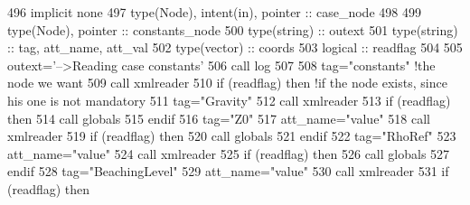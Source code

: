 \begin{DoxyCode}
496     \textcolor{keywordtype}{implicit none}
497     \textcolor{keywordtype}{type}(Node), \textcolor{keywordtype}{intent(in)}, \textcolor{keywordtype}{pointer} :: case\_node
498 
499     \textcolor{keywordtype}{type}(Node), \textcolor{keywordtype}{pointer} :: constants\_node
500     \textcolor{keywordtype}{type}(string) :: outext
501     \textcolor{keywordtype}{type}(string) :: tag, att\_name, att\_val
502     \textcolor{keywordtype}{type}(vector) :: coords
503     \textcolor{keywordtype}{logical} :: readflag
504 
505     outext=\textcolor{stringliteral}{'-->Reading case constants'}
506     \textcolor{keyword}{call }log%
507 
508     tag=\textcolor{stringliteral}{"constants"}    \textcolor{comment}{!the node we want}
509     \textcolor{keyword}{call }xmlreader%
510     \textcolor{keywordflow}{if} (readflag) \textcolor{keywordflow}{then} \textcolor{comment}{!if the node exists, since his one is not mandatory}
511         tag=\textcolor{stringliteral}{"Gravity"}
512         \textcolor{keyword}{call }xmlreader%
513         \textcolor{keywordflow}{if} (readflag) \textcolor{keywordflow}{then}
514             \textcolor{keyword}{call }globals%
515 \textcolor{keywordflow}{        endif}
516         tag=\textcolor{stringliteral}{"Z0"}
517         att\_name=\textcolor{stringliteral}{"value"}
518         \textcolor{keyword}{call }xmlreader%
519         \textcolor{keywordflow}{if} (readflag) \textcolor{keywordflow}{then}
520             \textcolor{keyword}{call }globals%
521 \textcolor{keywordflow}{        endif}
522         tag=\textcolor{stringliteral}{"RhoRef"}
523         att\_name=\textcolor{stringliteral}{"value"}
524         \textcolor{keyword}{call }xmlreader%
525         \textcolor{keywordflow}{if} (readflag) \textcolor{keywordflow}{then}
526             \textcolor{keyword}{call }globals%
527 \textcolor{keywordflow}{        endif}
528         tag=\textcolor{stringliteral}{"BeachingLevel"}
529         att\_name=\textcolor{stringliteral}{"value"}
530         \textcolor{keyword}{call }xmlreader%
531         \textcolor{keywordflow}{if} (readflag) \textcolor{keywordflow}{then}

\end{DoxyCode}

